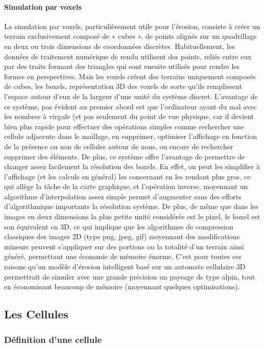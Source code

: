 \documentclass[a4paper,11pt]{article}
\begin{document}
\paragraph{Simulation par voxels}

La simulation par voxels, particulièrement utile pour l'érosion, consiste à créer un terrain exclusivement composé de « cubes », de points alignés sur un quadrillage en deux ou trois dimensions de coordonnées discrètes.
Habituellement, les données de traitement numérique de rendu utilisent des points, reliés entre eux par des traits formant des triangles qui sont ensuite utilisés pour rendre les formes en perspectives.
Mais les voxels créent des terrains uniquement composés de cubes, les boxels, représentation 3D des voxels de sorte qu'ils remplissent l'espace autour d'eux de la largeur d'une unité du système discret.
L'avantage de ce système, pas évident au premier abord est que l'ordinateur ayant du mal avec les nombres à virgule (et pas seulement du point de vue physique, car il devient bien plus rapide pour effectuer des opérations simples comme rechercher une cellule adjacente dans le maillage, en supprimer, optimiser l'affichage en fonction de la présence ou non de cellules autour de nous, ou encore de rechercher supprimer des éléments.
De plus, ce système offre l'avantage de permettre de changer assez facilement la résolution des boxels.
En effet, on peut les simplifier à l'affichage (et les calculs en général) les concernant en les rendant plus gros, ce qui allège la tâche de la carte graphique, et l'opération inverse, moyennant un algorithme d'interpolation assez simple permet d'augmenter sans des efforts d'algorithmique importants la résolution système.
De plus, de même que dans les images en deux dimensions la plus petite unité considérée est le pixel, le boxel est son équivalent en 3D, ce qui implique que les algorithmes de compression classiques des images 2D (type png, jpeg, gif) moyennant des modifications mineurs peuvent s'appliquer sur des portions ou la totalité d'un terrain ainsi généré, permettant une économie de mémoire énorme.
C'est pour toutes ces raisons qu'un modèle d'érosion intelligent basé sur un automate cellulaire 3D permettrait de simuler avec une grande précision un paysage de type alpin, tout en économisant beaucoup de mémoire (moyennant quelques optimisations).

\subsection{Les Cellules}
\subsubsection{Définition d'une cellule}
\end{document}
